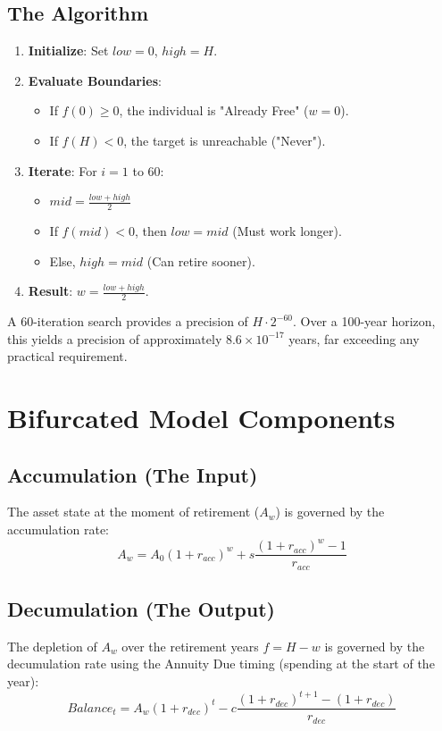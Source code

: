 \documentclass[11pt,letterpaper]{article}
\begin{document}
\subsection{The Algorithm}
\begin{enumerate}
    \item \textbf{Initialize}: Set $low = 0$, $high = H$.
    \item \textbf{Evaluate Boundaries}: 
        \begin{itemize}
            \item If $f(0) \geq 0$, the individual is "Already Free" ($w=0$).
            \item If $f(H) < 0$, the target is unreachable ("Never").
        \end{itemize}
    \item \textbf{Iterate}: For $i = 1$ to 60:
        \begin{itemize}
            \item $mid = \frac{low + high}{2}$
            \item If $f(mid) < 0$, then $low = mid$ (Must work longer).
            \item Else, $high = mid$ (Can retire sooner).
        \end{itemize}
    \item \textbf{Result}: $w = \frac{low + high}{2}$.
\end{enumerate}
A 60-iteration search provides a precision of $H \cdot 2^{-60}$. Over a 100-year horizon, this yields a precision of approximately $8.6 \times 10^{-17}$ years, far exceeding any practical requirement.

\section{Bifurcated Model Components}

\subsection{Accumulation (The Input)}
The asset state at the moment of retirement ($A_w$) is governed by the accumulation rate:
\begin{equation}
    A_w = A_0(1+r_{acc})^w + s \frac{(1+r_{acc})^w - 1}{r_{acc}}
\end{equation}

\subsection{Decumulation (The Output)}
The depletion of $A_w$ over the retirement years $f = H-w$ is governed by the decumulation rate using the Annuity Due timing (spending at the start of the year):
\begin{equation}
    Balance_t = A_w(1+r_{dec})^t - c \frac{(1+r_{dec})^{t+1} - (1+r_{dec})}{r_{dec}}
\end{equation}
\end{document}
